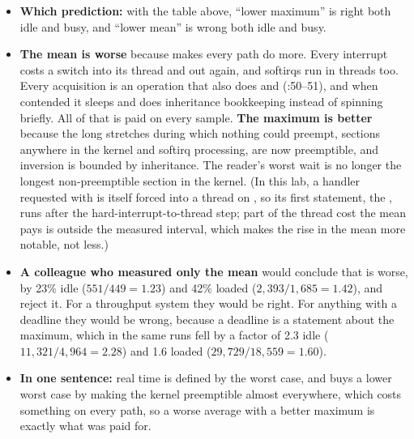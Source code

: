 \begin{itemize}
  \item \textbf{Which prediction:} with the table above, ``lower maximum'' is right both idle and
    busy, and ``lower mean'' is wrong both idle and busy.
  \item \textbf{The mean is worse} because  makes every path do more. Every
    interrupt costs a switch into its thread and out again, and softirqs run in threads too. Every
     acquisition is an  operation that also does
     and  (:50--51),
    and when contended it sleeps and does inheritance bookkeeping instead of spinning briefly. All
    of that is paid on every sample. \textbf{The maximum is better} because the long stretches
    during which nothing could preempt,  sections anywhere in the kernel and softirq
    processing, are now preemptible, and inversion is bounded by inheritance. The reader's worst
    wait is no longer the longest non-preemptible section in the kernel. (In this lab, a handler
    requested with  is itself forced into a thread on , so
    its first statement, the , runs after the hard-interrupt-to-thread step;
    part of the thread cost the mean pays is outside the measured interval, which makes the rise in
    the mean more notable, not less.)
  \item \textbf{A colleague who measured only the mean} would conclude that  is
    worse, by 23\% idle ($551 / 449 = 1.23$) and 42\% loaded ($2{,}393 / 1{,}685 = 1.42$), and reject
    it. For a throughput system they would be right. For anything with a deadline they would be
    wrong, because a deadline is a statement about the maximum, which in the same runs fell by a
    factor of 2.3 idle ($11{,}321 / 4{,}964 = 2.28$) and 1.6 loaded ($29{,}729 / 18{,}559 = 1.60$).
  \item \textbf{In one sentence:} real time is defined by the worst case, and  buys
    a lower worst case by making the kernel preemptible almost everywhere, which costs something on
    every path, so a worse average with a better maximum is exactly what was paid for.
\end{itemize}

